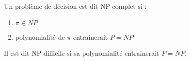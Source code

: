 \documentclass[a4paper, 8pt]{article}
\begin{document}
\begin{multicols*}{3}
Un problème de décision est dit NP-complet si :
\begin{enumerate}
	\item $\pi \in N\!P$
	\item polynomialité de $\pi$ entraînerait $P = N\!P$
\end{enumerate}
Il est dit NP-difficile si sa polynomialité entrainerait $P = N\!P$.

\end{multicols*}
\end{document}
